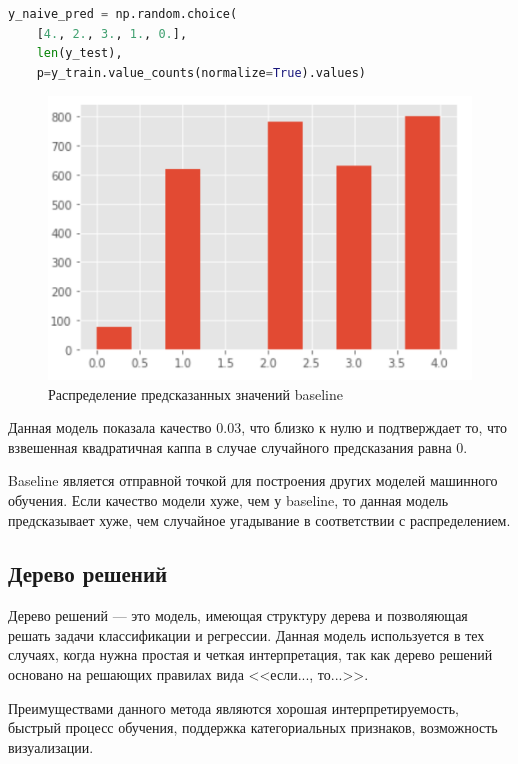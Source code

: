 \documentclass[14pt]{mmcs_article}
\begin{document}
\begin{lstlisting}[language=Python, caption={Python, создание baseline}, label=models:baselinecode]
y_naive_pred = np.random.choice(
	[4., 2., 3., 1., 0.], 
	len(y_test), 
	p=y_train.value_counts(normalize=True).values)
\end{lstlisting}

\begin{figure}[H]
	\centering
	\includegraphics[scale=1]{baseline.png}
	\caption{Распределение предсказанных значений baseline}\label{models:baseline}
\end{figure}

Данная модель показала качество 0.03, что близко к нулю и подтверждает то, что взвешенная квадратичная каппа в случае случайного предсказания равна 0.

Baseline является отправной точкой для построения других моделей машинного обучения. Если качество модели хуже, чем у baseline, то данная модель предсказывает хуже, чем случайное угадывание в соответствии с распределением.


\subsection{Дерево решений}

Дерево решений --- это модель, имеющая структуру дерева и позволяющая решать задачи классификации и регрессии. Данная модель используется в тех случаях, когда нужна простая и четкая интерпретация, так как дерево решений основано на решающих правилах вида <<если..., то...>>. 
 
Преимуществами данного метода являются хорошая интерпретируемость, быстрый процесс обучения, поддержка категориальных признаков, возможность визуализации.
\end{document}
